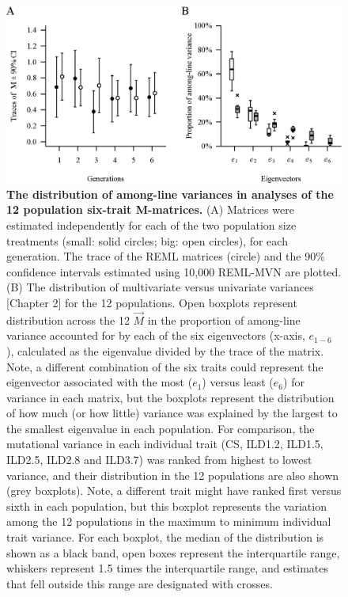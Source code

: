 \begin{figure}[htp]
\includegraphics[width=1\textwidth]{Chp3_Multi/M_traceNeigs.eps}
\vspace*{-0.4cm}
\caption[The distribution of among-line variances in analyses of the 12 population six-trait \textbf{M}-matrices.]{\textbf{The distribution of among-line variances in analyses of the 12 population six-trait M-matrices.} (A) Matrices were estimated independently for each of the two population size treatments (small: solid circles; big: open circles), for each generation. The trace of the REML matrices (circle) and the 90\% confidence intervals estimated using 10,000 REML-MVN are plotted. (B) The distribution of multivariate versus univariate variances [Chapter 2] for the 12 populations. Open boxplots represent distribution across the 12 $\vec{M}$ in the proportion of among-line variance accounted for by each of the six eigenvectors (x-axis, $e_{1-6}$ ), calculated as the eigenvalue divided by the trace of the matrix. Note, a different combination of the six traits could represent the eigenvector associated with the most ($e_1$) versus least ($e_6$) for variance in each matrix, but the boxplots represent the distribution of how much (or how little) variance was explained by the largest to the smallest eigenvalue in each population. For comparison, the mutational variance in each individual trait (CS, ILD1.2, ILD1.5, ILD2.5, ILD2.8 and ILD3.7) was ranked from highest to lowest variance, and their distribution in the 12 populations are also shown (grey boxplots). Note, a different trait might have ranked first versus sixth in each population, but this boxplot represents the variation among the 12 populations in the maximum to minimum individual trait variance. For each boxplot, the median of the distribution is shown as a black band, open boxes represent the interquartile range, whiskers represent 1.5 times the interquartile range, and estimates that fell outside this range are designated with crosses.}
\label{fig:multi_specM}
\end{figure}
\FloatBarrier

